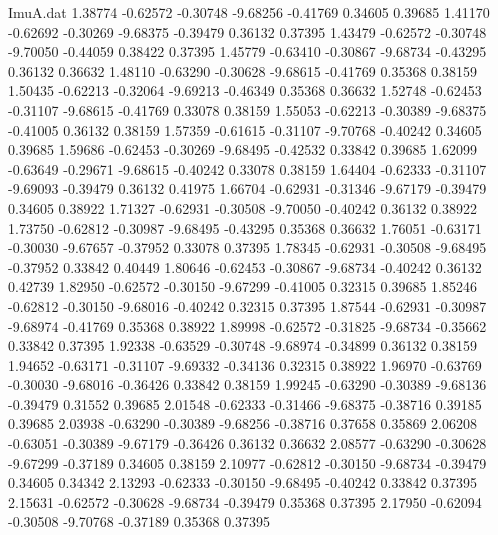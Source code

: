 \begin{filecontents}{ImuA.dat}
   1.38774   -0.62572   -0.30748   -9.68256   -0.41769    0.34605    0.39685
   1.41170   -0.62692   -0.30269   -9.68375   -0.39479    0.36132    0.37395
   1.43479   -0.62572   -0.30748   -9.70050   -0.44059    0.38422    0.37395
   1.45779   -0.63410   -0.30867   -9.68734   -0.43295    0.36132    0.36632
   1.48110   -0.63290   -0.30628   -9.68615   -0.41769    0.35368    0.38159
   1.50435   -0.62213   -0.32064   -9.69213   -0.46349    0.35368    0.36632
   1.52748   -0.62453   -0.31107   -9.68615   -0.41769    0.33078    0.38159
   1.55053   -0.62213   -0.30389   -9.68375   -0.41005    0.36132    0.38159
   1.57359   -0.61615   -0.31107   -9.70768   -0.40242    0.34605    0.39685
   1.59686   -0.62453   -0.30269   -9.68495   -0.42532    0.33842    0.39685
   1.62099   -0.63649   -0.29671   -9.68615   -0.40242    0.33078    0.38159
   1.64404   -0.62333   -0.31107   -9.69093   -0.39479    0.36132    0.41975
   1.66704   -0.62931   -0.31346   -9.67179   -0.39479    0.34605    0.38922
   1.71327   -0.62931   -0.30508   -9.70050   -0.40242    0.36132    0.38922
   1.73750   -0.62812   -0.30987   -9.68495   -0.43295    0.35368    0.36632
   1.76051   -0.63171   -0.30030   -9.67657   -0.37952    0.33078    0.37395
   1.78345   -0.62931   -0.30508   -9.68495   -0.37952    0.33842    0.40449
   1.80646   -0.62453   -0.30867   -9.68734   -0.40242    0.36132    0.42739
   1.82950   -0.62572   -0.30150   -9.67299   -0.41005    0.32315    0.39685
   1.85246   -0.62812   -0.30150   -9.68016   -0.40242    0.32315    0.37395
   1.87544   -0.62931   -0.30987   -9.68974   -0.41769    0.35368    0.38922
   1.89998   -0.62572   -0.31825   -9.68734   -0.35662    0.33842    0.37395
   1.92338   -0.63529   -0.30748   -9.68974   -0.34899    0.36132    0.38159
   1.94652   -0.63171   -0.31107   -9.69332   -0.34136    0.32315    0.38922
   1.96970   -0.63769   -0.30030   -9.68016   -0.36426    0.33842    0.38159
   1.99245   -0.63290   -0.30389   -9.68136   -0.39479    0.31552    0.39685
   2.01548   -0.62333   -0.31466   -9.68375   -0.38716    0.39185    0.39685
   2.03938   -0.63290   -0.30389   -9.68256   -0.38716    0.37658    0.35869
   2.06208   -0.63051   -0.30389   -9.67179   -0.36426    0.36132    0.36632
   2.08577   -0.63290   -0.30628   -9.67299   -0.37189    0.34605    0.38159
   2.10977   -0.62812   -0.30150   -9.68734   -0.39479    0.34605    0.34342
   2.13293   -0.62333   -0.30150   -9.68495   -0.40242    0.33842    0.37395
   2.15631   -0.62572   -0.30628   -9.68734   -0.39479    0.35368    0.37395
   2.17950   -0.62094   -0.30508   -9.70768   -0.37189    0.35368    0.37395

\end{filecontents}
